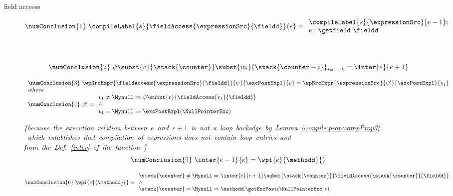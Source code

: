 \begin{description}
       \item[field accesss]
            
		    $$ \numConclusion{1} \ \compileLabel{s}{\fieldAccess{\expressionSrc}{\fieldd}}{e} = \\
		     \begin{array}{l}
			   \compileLabel{s}{\expressionSrc}{e - 1}; \\ 
			    e  : \getfield  \ \fieldd
		     \end{array}$$	\\ 
		 	
	              \\
		 $$ \numConclusion{2} \  \psi \subst{v}{\stack{\counter}}\subst{w_i}{\stack{\counter - i}}_{i = 1 \ldots k}  = \inter{e}{e+1} $$ 

		  $$ \begin{array}{l}\numConclusion{3} \ \wpSrcExpr{\fieldAccess{\expressionSrc}{\fieldd} }{\psi}{\excPostExpl}{v} = 
		  \wpSrcExpr{\expressionSrc}{\psi'}{\excPostExpl }{v_1}  \\
		  where \\ 
		  \numConclusion{4} \ \psi'  =                   \begin{array}{l} 
		                                 v_1 \neq \Mynull \Rightarrow \psi \subst{v}{\fieldAccess{v_1}{\fieldd}} \\
						 \wedge \\
						 v_1 = \Mynull \Rightarrow  \excPostExpl(\NullPointerExc)
					       \end{array}
				\end{array}  \\
		  $$
		 
		  \mbox{\rm\textit{\{because the execution relation between $e$ and $e+1 $ is not a loop backedge by Lemma \ref{compile:prop:compProp3} }} \\
		  \mbox{\rm\textit{ which establishes that compilation of expressions does not contain loop entries and }}\\
		  \mbox{\rm\textit{from the Def. \ref{inter} of the function \interOnly \}}} 
		  $$\numConclusion{5} \  \inter{e-1}{e} = \wpi{e}{\methodd}{} $$ 
		
		 $$\numConclusion{6} \  \wpi{e}{\methodd}{} = \\
		                     \begin{array}{l} \stack{\counter} \neq \Mynull \Rightarrow \inter{e}{e+1} \subst{\stack{\counter}}{\fieldAccess{\stack{\counter}}{\fieldd} } \\
		                      \wedge \\  
				      \stack{\counter}  = \Mynull \Rightarrow \methodd.\getExcPost(\NullPointerExc, e ) \end{array}$$
		

\end{description}
